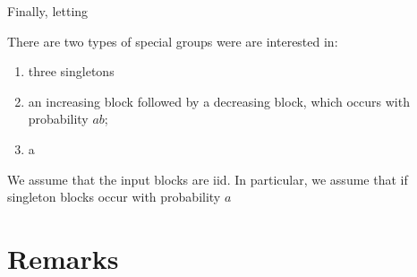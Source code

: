 \documentclass{patmorin}
\begin{document}
Finally, letting 



 There are two types of special groups were are interested in:

\begin{enumerate}
   \item three singletons 
   \item an increasing block followed by a decreasing block, which occurs with probability $ab$;
   \item a 
\end{enumerate}

We assume that the input blocks are iid.  In particular, we assume that if singleton blocks occur with probability $a$


\section{Remarks}



\end{document}
